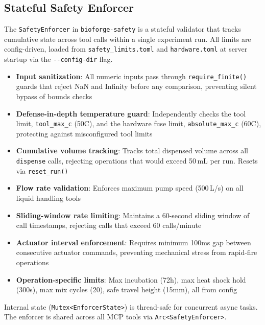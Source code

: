 \documentclass[11pt,letterpaper]{article}
\begin{document}
\subsection{Stateful Safety Enforcer}

The \texttt{SafetyEnforcer} in \texttt{bioforge-safety} is a stateful validator that tracks cumulative state across tool calls within a single experiment run. All limits are config-driven, loaded from \texttt{safety\_limits.toml} and \texttt{hardware.toml} at server startup via the \texttt{-{}-config-dir} flag.

\begin{keybox}
\begin{itemize}
  \item \textbf{Input sanitization}: All numeric inputs pass through \texttt{require\_finite()} guards that reject NaN and Infinity before any comparison, preventing silent bypass of bounds checks
  \item \textbf{Defense-in-depth temperature guard}: Independently checks the tool limit, \texttt{tool\_max\_c} (50\textdegree{}C), and the hardware fuse limit, \texttt{absolute\_max\_c} (60\textdegree{}C), protecting against misconfigured tool limits
  \item \textbf{Cumulative volume tracking}: Tracks total dispensed volume across all \texttt{dispense} calls, rejecting operations that would exceed 50\,mL per run. Resets via \texttt{reset\_run()}
  \item \textbf{Flow rate validation}: Enforces maximum pump speed (500\,\textmu{}L/s) on all liquid handling tools
  \item \textbf{Sliding-window rate limiting}: Maintains a 60-second sliding window of call timestamps, rejecting calls that exceed 60 calls/minute
  \item \textbf{Actuator interval enforcement}: Requires minimum 100ms gap between consecutive actuator commands, preventing mechanical stress from rapid-fire operations
  \item \textbf{Operation-specific limits}: Max incubation (72h), max heat shock hold (300s), max mix cycles (20), safe travel height (15mm), all from config
\end{itemize}
\end{keybox}

Internal state (\texttt{Mutex<EnforcerState>}) is thread-safe for concurrent async tasks. The enforcer is shared across all MCP tools via \texttt{Arc<SafetyEnforcer>}.
\end{document}
